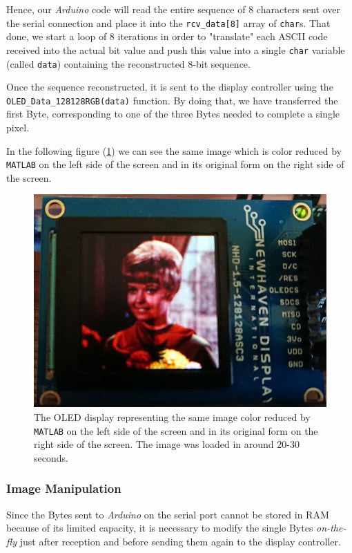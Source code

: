 \documentclass[a4paper]{article}
\begin{document}
            Hence, our \emph{Arduino} code will read the entire sequence of 8 characters sent over the serial connection and place it into the \texttt{rcv\_data[8]} array of \texttt{char}s. That done, we start a loop of 8 iterations in order to "translate" each ASCII code received into the actual bit value and push this value into a single \texttt{char} variable (called \texttt{data}) containing the reconstructed 8-bit sequence.

            Once the sequence reconstructed, it is sent to the display controller using the \texttt{OLED\_Data\_128128RGB(data)} function. By doing that, we have transferred the first Byte, corresponding to one of the three Bytes needed to complete a single pixel.

            In the following figure (\ref{fig:OriginalImageArduino}) we can see the same image which is color reduced by \texttt{MATLAB} on the left side of the screen and in its original form on the right side of the screen.

            \begin{figure}[htp]
                \centering
                \includegraphics[width=0.4 \columnwidth]{./screenshots/OriginalImageArduino}
                \caption{
                        \label{fig:OriginalImageArduino}
                        The OLED display representing the same image color reduced by \texttt{MATLAB} on the left side of the screen and in its original form on the right side of the screen. The image was loaded in around 20-30 seconds.
                }
            \end{figure}

        \subsubsection{Image Manipulation}

            Since the Bytes sent to \emph{Arduino} on the serial port cannot be stored in RAM because of its limited capacity, it is necessary to modify the single Bytes \emph{on-the-fly} just after reception and before sending them again to the display controller.
\end{document}
